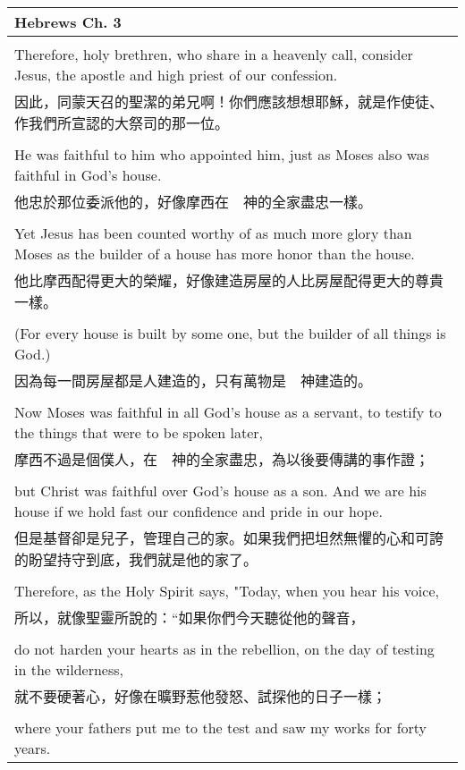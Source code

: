 \documentclass{book}
\begin{document}
\begin{tabularx}{\textwidth}{p{}}
\hline
Hebrews Ch. 3 \\
\hline \\
Therefore, holy brethren, who share in a heavenly call, consider Jesus, the apostle and high priest of our confession. \\
因此，同蒙天召的聖潔的弟兄啊！你們應該想想耶穌，就是作使徒、作我們所宣認的大祭司的那一位。 \\ \\
He was faithful to him who appointed him, just as Moses also was faithful in God's house. \\
他忠於那位委派他的，好像摩西在　神的全家盡忠一樣。 \\ \\
Yet Jesus has been counted worthy of as much more glory than Moses as the builder of a house has more honor than the house. \\
他比摩西配得更大的榮耀，好像建造房屋的人比房屋配得更大的尊貴一樣。 \\ \\
(For every house is built by some one, but the builder of all things is God.) \\
因為每一間房屋都是人建造的，只有萬物是　神建造的。 \\ \\
Now Moses was faithful in all God's house as a servant, to testify to the things that were to be spoken later, \\
摩西不過是個僕人，在　神的全家盡忠，為以後要傳講的事作證； \\ \\
but Christ was faithful over God's house as a son. And we are his house if we hold fast our confidence and pride in our hope. \\
但是基督卻是兒子，管理自己的家。如果我們把坦然無懼的心和可誇的盼望持守到底，我們就是他的家了。 \\ \\
Therefore, as the Holy Spirit says, "Today, when you hear his voice, \\
所以，就像聖靈所說的：“如果你們今天聽從他的聲音， \\ \\
do not harden your hearts as in the rebellion, on the day of testing in the wilderness, \\
就不要硬著心，好像在曠野惹他發怒、試探他的日子一樣； \\ \\
where your fathers put me to the test and saw my works for forty years. \\

\end{tabularx}
\end{document}
